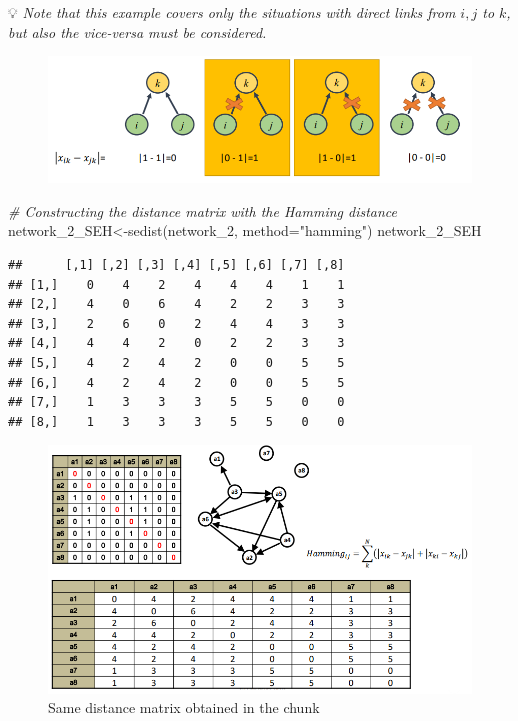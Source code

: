 \documentclass[
  notitlepage,
  onecolumn,
  openany]{book}
\newenvironment{Shaded}{\begin{snugshade}}{\end{snugshade}}
\newcommand{\AttributeTok}[1]{\textcolor[rgb]{0.77,0.63,0.00}{#1}}
\newcommand{\CommentTok}[1]{\textcolor[rgb]{0.56,0.35,0.01}{\textit{#1}}}
\newcommand{\FunctionTok}[1]{\textcolor[rgb]{0.00,0.00,0.00}{#1}}
\newcommand{\NormalTok}[1]{#1}
\newcommand{\OtherTok}[1]{\textcolor[rgb]{0.56,0.35,0.01}{#1}}
\newcommand{\StringTok}[1]{\textcolor[rgb]{0.31,0.60,0.02}{#1}}
\begin{document}
💡 \emph{Note that this example covers only the situations with direct links from \(i,j\) to \(k\), but also the vice-versa must be considered.}

\begin{figure}[h!]

{\centering \includegraphics[width=0.7\linewidth]{images/11-Subgroups and Structural Equivalence/Untitled 6} 

}

\end{figure}

\begin{Shaded}
\begin{Highlighting}[]
\CommentTok{\# Constructing the distance matrix with the Hamming distance}
\NormalTok{network\_2\_SEH}\OtherTok{\textless{}{-}}\FunctionTok{sedist}\NormalTok{(network\_2, }\AttributeTok{method=}\StringTok{"hamming"}\NormalTok{)}
\NormalTok{network\_2\_SEH }
\end{Highlighting}
\end{Shaded}

\begin{verbatim}
##      [,1] [,2] [,3] [,4] [,5] [,6] [,7] [,8]
## [1,]    0    4    2    4    4    4    1    1
## [2,]    4    0    6    4    2    2    3    3
## [3,]    2    6    0    2    4    4    3    3
## [4,]    4    4    2    0    2    2    3    3
## [5,]    4    2    4    2    0    0    5    5
## [6,]    4    2    4    2    0    0    5    5
## [7,]    1    3    3    3    5    5    0    0
## [8,]    1    3    3    3    5    5    0    0
\end{verbatim}

\begin{figure}[h!]

{\centering \includegraphics[width=0.8\linewidth]{images/11-Subgroups and Structural Equivalence/Untitled 7} 

}

\caption{Same distance matrix obtained in the chunk}\label{fig:unnamed-chunk-94}
\end{figure}
\end{document}
